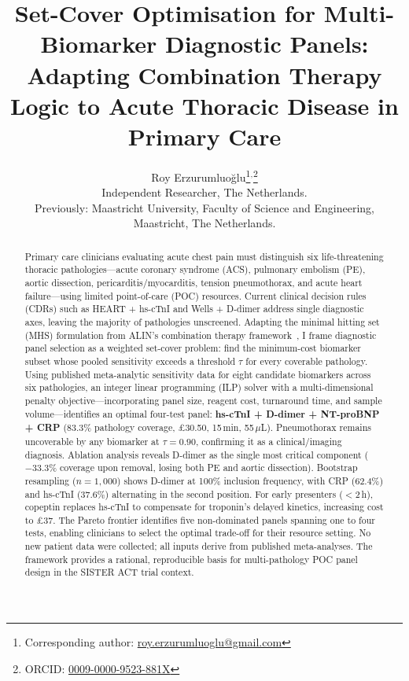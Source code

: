 \documentclass[times, twoside, watermark]{zHenriquesLab-StyleBioRxiv}
\providecommand{\shorttitle}[1]{}
\providecommand{\shorttitle}[1]{}
\begin{document}
\title{Set-Cover Optimisation for Multi-Biomarker Diagnostic Panels:\\Adapting Combination Therapy Logic to Acute Thoracic Disease in Primary Care}
\shorttitle{Set-Cover Diagnostic Panel Optimisation}

\author{Roy Erzurumluoğlu\thanks{Corresponding author: \href{mailto:roy.erzurumluoglu@gmail.com}{roy.erzurumluoglu@gmail.com}}$^{,}$\thanks{ORCID: \href{https://orcid.org/0009-0000-9523-881X}{0009-0000-9523-881X}}\\
  Independent Researcher, The Netherlands.\\
  {\small Previously: Maastricht University, Faculty of Science and Engineering, Maastricht, The Netherlands.}}

\maketitle

\begin{abstract}
Primary care clinicians evaluating acute chest pain must distinguish six life-threatening thoracic pathologies---acute coronary syndrome (ACS), pulmonary embolism (PE), aortic dissection, pericarditis/myocarditis, tension pneumothorax, and acute heart failure---using limited point-of-care (POC) resources. Current clinical decision rules (CDRs) such as HEART + hs-cTnI and Wells + D-dimer address single diagnostic axes, leaving the majority of pathologies unscreened. Adapting the minimal hitting set (MHS) formulation from ALIN's combination therapy framework~\cite{Erzurumluoglu2026ALIN}, I frame diagnostic panel selection as a weighted set-cover problem: find the minimum-cost biomarker subset whose pooled sensitivity exceeds a threshold $\tau$ for every coverable pathology. Using published meta-analytic sensitivity data for eight candidate biomarkers across six pathologies, an integer linear programming (ILP) solver with a multi-dimensional penalty objective---incorporating panel size, reagent cost, turnaround time, and sample volume---identifies an optimal four-test panel: \textbf{hs-cTnI + D-dimer + NT-proBNP + CRP} (83.3\% pathology coverage, \pounds30.50, 15\,min, 55\,$\mu$L). Pneumothorax remains uncoverable by any biomarker at $\tau = 0.90$, confirming it as a clinical/imaging diagnosis. Ablation analysis reveals D-dimer as the single most critical component ($-33.3\%$ coverage upon removal, losing both PE and aortic dissection). Bootstrap resampling ($n = 1{,}000$) shows D-dimer at 100\% inclusion frequency, with CRP (62.4\%) and hs-cTnI (37.6\%) alternating in the second position. For early presenters ($<$2\,h), copeptin replaces hs-cTnI to compensate for troponin's delayed kinetics, increasing cost to \pounds37. The Pareto frontier identifies five non-dominated panels spanning one to four tests, enabling clinicians to select the optimal trade-off for their resource setting. No new patient data were collected; all inputs derive from published meta-analyses. The framework provides a rational, reproducible basis for multi-pathology POC panel design in the SISTER ACT trial context.
\end{abstract}
\end{document}
